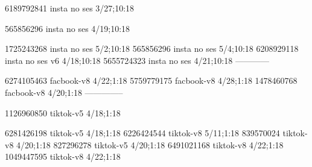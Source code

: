 
6189792841 insta no ses
3/27;10:18

565856296 insta no ses
4/19;10:18

1725243268 insta no ses
5/2;10:18
565856296 insta no ses
5/4;10:18
6208929118 insta no ses v6
4/18;10:18
5655724323 insta no ses
4/21;10:18
------------

6274105463 facbook-v8
4/22;1:18
5759779175 facbook-v8
4/28;1:18
1478460768 facbook-v8
4/20;1:18
--------------

1126960850 tiktok-v5
4/18;1:18

6281426198 tiktok-v5
4/18;1:18
6226424544 tiktok-v8
5/11;1:18
839570024 tiktok-v8
4/20;1:18
827296278 tiktok-v5
4/20;1:18
6491021168 tiktok-v8
4/22;1:18
1049447595 tiktok-v8
4/22;1:18

